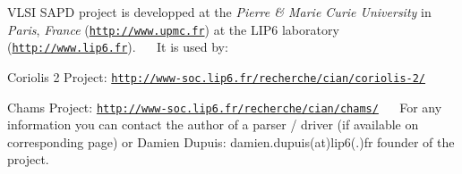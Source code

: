 V\+L\+SI S\+A\+PD project is developped at the {\itshape Pierre \& Marie Curie University} in {\itshape Paris}, {\itshape France} (\href{http://www.upmc.fr}{\tt http\+://www.\+upmc.\+fr}) at the L\+I\+P6 laboratory (\href{http://www.lip6.fr}{\tt http\+://www.\+lip6.\+fr}).~\newline
~\newline
 It is used by\+:
\begin{DoxyItemize}
\item Coriolis 2 Project\+: \href{http://www-soc.lip6.fr/recherche/cian/coriolis-2/}{\tt http\+://www-\/soc.\+lip6.\+fr/recherche/cian/coriolis-\/2/}
\item Chams Project\+: \href{http://www-soc.lip6.fr/recherche/cian/chams/}{\tt http\+://www-\/soc.\+lip6.\+fr/recherche/cian/chams/}~\newline
~\newline
 For any information you can contact the author of a parser / driver (if available on corresponding page) or Damien Dupuis\+: damien.\+dupuis(at)lip6(.)fr founder of the project. 
\end{DoxyItemize}